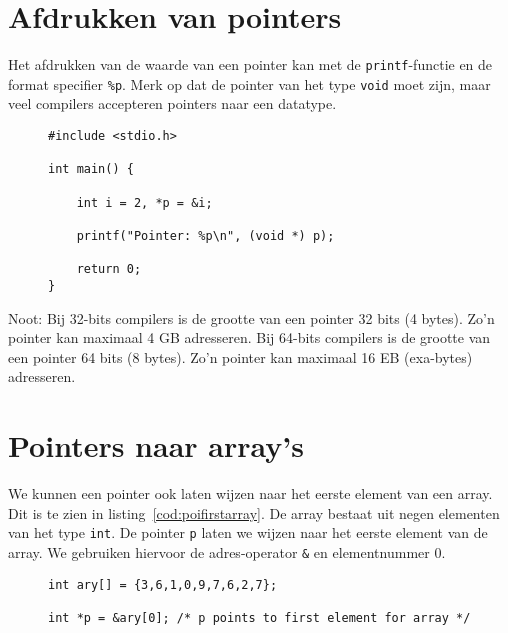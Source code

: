 \section{Afdrukken van pointers}
\label{sec:afdrukkenvanpointers}
Het afdrukken van de waarde van een pointer kan met de \texttt{printf}-functie en de format specifier \texttt{\%p}. Merk op dat de pointer van het type \texttt{void} moet zijn, maar veel compilers accepteren pointers naar een datatype.

\begin{figure}[!ht]
\begin{lstlisting}[caption=Afdrukken van een pointer.]
#include <stdio.h>

int main() {

    int i = 2, *p = &i;

    printf("Pointer: %p\n", (void *) p);

    return 0;
}
\end{lstlisting}
\end{figure}

Noot: Bij 32-bits compilers is de grootte van een pointer 32 bits (4 bytes). Zo'n pointer kan maximaal 4 GB adresseren. Bij 64-bits compilers is de grootte van een pointer 64 bits (8 bytes). Zo'n pointer kan maximaal 16 EB (exa-bytes) adresseren.

\section{Pointers naar array's}
\label{sec:pointersnaararrays}
We kunnen een pointer ook laten wijzen naar het eerste element van een array. Dit is te zien in listing~\ref{cod:poifirstarray}. De array bestaat uit negen elementen van het type \texttt{int}. De pointer \texttt{p} laten we wijzen naar het eerste element van de array. We gebruiken hiervoor de adres-operator \texttt{\&} en elementnummer 0.

\begin{figure}[!ht]
\begin{lstlisting}[caption=Een pointer naar het eerste element van een array.,label=cod:poifirstarray]
int ary[] = {3,6,1,0,9,7,6,2,7};

int *p = &ary[0]; /* p points to first element for array */
\end{lstlisting}
\end{figure}

